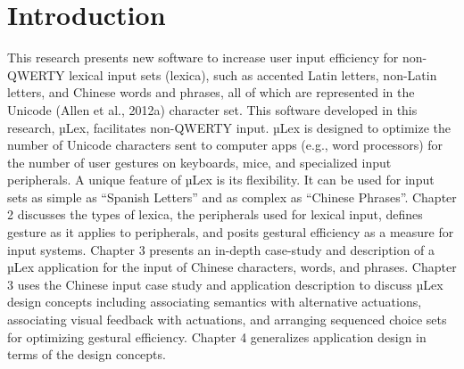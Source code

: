 \chapter{Introduction}
\label{ch:intro}

This research presents new software to increase user input efficiency for non-QWERTY lexical input sets (lexica), such as accented Latin letters, non-Latin letters, and Chinese words and phrases, all of which are represented in the Unicode (Allen et al., 2012a) character set.
This software developed in this research, µLex, facilitates non-QWERTY input.  µLex is designed to optimize the number of Unicode characters sent to computer apps (e.g., word processors) for the number of user gestures on keyboards, mice, and specialized input peripherals.
A unique feature of µLex is its flexibility.  It can be used for input sets as simple as “Spanish Letters” and as complex as “Chinese Phrases”.
Chapter 2 discusses the types of lexica, the peripherals used for lexical input, defines gesture as it applies to peripherals, and posits gestural efficiency as a measure for input systems.
Chapter 3 presents an in-depth case-study and description of a µLex application for the input of Chinese characters, words, and phrases.
Chapter 3 uses the Chinese input case study and application description to discuss µLex design concepts including associating semantics with alternative actuations, associating visual feedback with actuations, and arranging sequenced choice sets for optimizing gestural efficiency.
Chapter 4 generalizes application design in terms of the design concepts.


